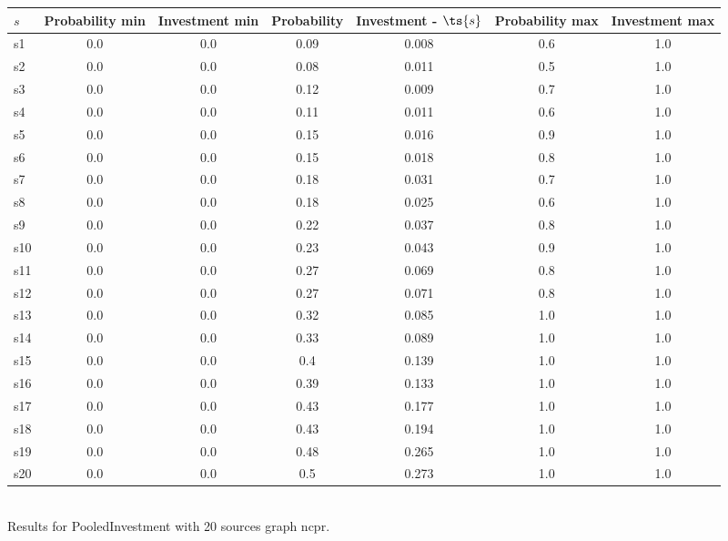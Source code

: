 \documentclass{article}
\begin{document}
\noindent\begin{tabular}{|l|c|c|c|c|c|c|}
\hline
$s$& Probability min & Investment min & Probability & Investment - $\ts{s}$ & Probability max & Investment max\\
\hline
s1 &0.0 & 0.0 & 0.09 & 0.008 & 0.6 & 1.0\\
\hline
s2 &0.0 & 0.0 & 0.08 & 0.011 & 0.5 & 1.0\\
\hline
s3 &0.0 & 0.0 & 0.12 & 0.009 & 0.7 & 1.0\\
\hline
s4 &0.0 & 0.0 & 0.11 & 0.011 & 0.6 & 1.0\\
\hline
s5 &0.0 & 0.0 & 0.15 & 0.016 & 0.9 & 1.0\\
\hline
s6 &0.0 & 0.0 & 0.15 & 0.018 & 0.8 & 1.0\\
\hline
s7 &0.0 & 0.0 & 0.18 & 0.031 & 0.7 & 1.0\\
\hline
s8 &0.0 & 0.0 & 0.18 & 0.025 & 0.6 & 1.0\\
\hline
s9 &0.0 & 0.0 & 0.22 & 0.037 & 0.8 & 1.0\\
\hline
s10 &0.0 & 0.0 & 0.23 & 0.043 & 0.9 & 1.0\\
\hline
s11 &0.0 & 0.0 & 0.27 & 0.069 & 0.8 & 1.0\\
\hline
s12 &0.0 & 0.0 & 0.27 & 0.071 & 0.8 & 1.0\\
\hline
s13 &0.0 & 0.0 & 0.32 & 0.085 & 1.0 & 1.0\\
\hline
s14 &0.0 & 0.0 & 0.33 & 0.089 & 1.0 & 1.0\\
\hline
s15 &0.0 & 0.0 & 0.4 & 0.139 & 1.0 & 1.0\\
\hline
s16 &0.0 & 0.0 & 0.39 & 0.133 & 1.0 & 1.0\\
\hline
s17 &0.0 & 0.0 & 0.43 & 0.177 & 1.0 & 1.0\\
\hline
s18 &0.0 & 0.0 & 0.43 & 0.194 & 1.0 & 1.0\\
\hline
s19 &0.0 & 0.0 & 0.48 & 0.265 & 1.0 & 1.0\\
\hline
s20 &0.0 & 0.0 & 0.5 & 0.273 & 1.0 & 1.0\\
\hline
\end{tabular}\\

\noindent Results for PooledInvestment with 20 sources graph ncpr.
\end{document}
